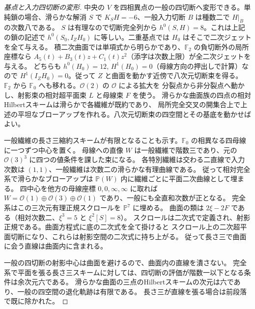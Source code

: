 \begin{proof}[基点と入力四切断の変形]
中央の $V$ を四相異点の一般の四切断へ変形できる。単純鎖の場合、滑らかな解消 $S$ で
$K_SH=-6$、一般入力切断 $B$ は種数二で $H|_B$ の次数八である。
$S$ は有理なので切断完全列から $h^0(S,H)=8$。これは上記の鎖の記述で
$h^0(S_0,I_Z H_0)$ に等しい。二重基点では $H_0$ はそこで二次ジェットを全て与える。
積二次曲面では単項式から明らかであり、$\mathbb F_2$ の負切断外の局所座標なら
$A_5(t)+B_3(t)z+C_1(t)z^2$（添字は次数上限）が全二次ジェットを与える。
どちらも $h^0(H_0)=12$, $H^1(H_0)=0$（母線方向の押出しで計算）なので
$H^1(I_Z H_0)=0$。従って $Z$ と曲面を動かす近傍で八次元切断束を得る。
$\mathbb F_2$ から $\mathbb F_0$ へも移れる。$\mathcal O(2)$ の $\mathcal O$ による拡大を
分裂点から非分裂点へ動かし、射影束の相対超平面束 $L$ と母線束 $F$ を使う。
滑らかな曲面族の四点の相対Hilbertスキームは滑らかで各繊維が既約であり、
局所完全交叉の開集合上で上述の平坦なブローアップを作れる。八次元切断束の四空間とその基底を動かせばよい。

一般繊維の長さ三縮約スキームが有限となることも示す。$\mathbb F_0$ の相異なる四母線に一つずつ中心を置く。
母線への直像 $W$ は一般繊維で階数三であり、元の $\mathcal O(3)^3$ に四つの値条件を課した束になる。
各特別繊維は交わる二直線で入力次数は $(1,1)$、一般繊維は次数二の滑らかな有理曲線である。
従って相対完全系で滑らかなブローアップは $\mathbb P(W)$ 内に繊維ごとに平面二次曲線として埋まる。
四中心を他方の母線座標 $0,0,\infty,\infty$ に取れば
$W=\mathcal O(1)\oplus\mathcal O(3)\oplus\mathcal O(1)$ であり、一般にも全直和次数が正となる。
完全系はこの三次元有理正規スクロールを $\mathbb P^7$ に埋める。
曲面の類は $2\xi-2F$ である（相対次数二、$\xi^3=5$ と $\xi^2[S]=8$）。
スクロールは二次式で定義され、射影正規である。曲面方程式に底の二次式を全て掛けると
スクロール上の二次超平面切断になり、これらは射影空間の二次式に持ち上がる。
従って長さ三で曲面に会う直線は曲面内に含まれる。

一般の四切断の射影中心は曲面を避けるので、曲面内の直線を潰さない。
完全系で平面を張る長さ三スキームに対しては、四切断の評価が階数一以下となる条件は余次元六である。
滑らかな曲面の三点のHilbertスキームの次元は六であり、一般の四空間の退化軌跡は有限である。
長さ三が直線を張る場合は前段落で既に除かれた。
\end{proof}

